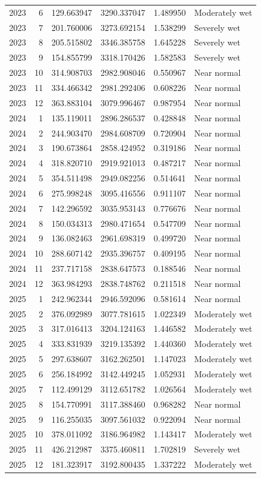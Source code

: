 \begin{tabular}{rrrrrl}
2023 & 6 & 129.663947 & 3290.337047 & 1.489950 & Moderately wet \\
2023 & 7 & 201.760006 & 3273.692154 & 1.538299 & Severely wet \\
2023 & 8 & 205.515802 & 3346.385758 & 1.645228 & Severely wet \\
2023 & 9 & 154.855799 & 3318.170426 & 1.582583 & Severely wet \\
2023 & 10 & 314.908703 & 2982.908046 & 0.550967 & Near normal \\
2023 & 11 & 334.466342 & 2981.292406 & 0.608226 & Near normal \\
2023 & 12 & 363.883104 & 3079.996467 & 0.987954 & Near normal \\
2024 & 1 & 135.119011 & 2896.286537 & 0.428848 & Near normal \\
2024 & 2 & 244.903470 & 2984.608709 & 0.720904 & Near normal \\
2024 & 3 & 190.673864 & 2858.424952 & 0.319186 & Near normal \\
2024 & 4 & 318.820710 & 2919.921013 & 0.487217 & Near normal \\
2024 & 5 & 354.511498 & 2949.082256 & 0.514641 & Near normal \\
2024 & 6 & 275.998248 & 3095.416556 & 0.911107 & Near normal \\
2024 & 7 & 142.296592 & 3035.953143 & 0.776676 & Near normal \\
2024 & 8 & 150.034313 & 2980.471654 & 0.547709 & Near normal \\
2024 & 9 & 136.082463 & 2961.698319 & 0.499720 & Near normal \\
2024 & 10 & 288.607142 & 2935.396757 & 0.409195 & Near normal \\
2024 & 11 & 237.717158 & 2838.647573 & 0.188546 & Near normal \\
2024 & 12 & 363.984293 & 2838.748762 & 0.211518 & Near normal \\
2025 & 1 & 242.962344 & 2946.592096 & 0.581614 & Near normal \\
2025 & 2 & 376.092989 & 3077.781615 & 1.022349 & Moderately wet \\
2025 & 3 & 317.016413 & 3204.124163 & 1.446582 & Moderately wet \\
2025 & 4 & 333.831939 & 3219.135392 & 1.440360 & Moderately wet \\
2025 & 5 & 297.638607 & 3162.262501 & 1.147023 & Moderately wet \\
2025 & 6 & 256.184992 & 3142.449245 & 1.052931 & Moderately wet \\
2025 & 7 & 112.499129 & 3112.651782 & 1.026564 & Moderately wet \\
2025 & 8 & 154.770991 & 3117.388460 & 0.968282 & Near normal \\
2025 & 9 & 116.255035 & 3097.561032 & 0.922094 & Near normal \\
2025 & 10 & 378.011092 & 3186.964982 & 1.143417 & Moderately wet \\
2025 & 11 & 426.212987 & 3375.460811 & 1.702819 & Severely wet \\
2025 & 12 & 181.323917 & 3192.800435 & 1.337222 & Moderately wet \\
\bottomrule
\end{tabular}
